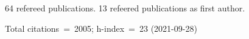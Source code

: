 64 refereed publications. 13 refeered publications as first author.

Total citations~=~2005; h-index~=~23 (2021-09-28)